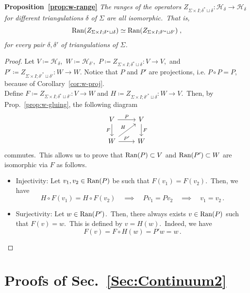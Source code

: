 \documentclass[11pt]{article}
\theoremstyle{definition}
\numberwithin{equation}{section}
\begin{document}
\noindent
\textbf{Proposition~\ref{prop:w-range}} \emph{The ranges of the operators $Z_{\Sigma\times I;\delta^* \sqcup \delta}:\mathcal{H}_{\delta}\to\mathcal{H}_{\delta}$ for different triangulations $\delta$ of $\Sigma$ are all isomorphic.~That is,  
   \begin{equation}
   {\rm Ran}(Z_{\Sigma\times I;\delta^* \sqcup \delta})\simeq {\rm Ran}(Z_{\Sigma\times I;\delta'^* \sqcup \delta'})\;,
   \end{equation}
   for every pair $\delta,\delta'$ of triangulations of $\Sigma$.}
\begin{proof}
    Let $V\coloneqq \mathcal{H}_{\delta}$,~$W\coloneqq \mathcal{H}_{\delta'}$,~$P\coloneqq Z_{\Sigma\times I;\delta^* \sqcup \delta}:V\to V$,~and $P'\coloneqq Z_{\Sigma\times I;\delta'^* \sqcup \delta'}:W\to W$. Notice that $P$ and $P'$ are projections, i.e. $P\circ P=P$, because of Corollary~\ref{cor:w-proj}. \\
    Define $F\coloneqq Z_{\Sigma\times I;\delta^* \sqcup \delta'}:V\to W$ and $H\coloneqq Z_{\Sigma\times I;\delta'^* \sqcup \delta}:W\to V$.~Then, by Prop.~\ref{prop:w-gluing}, the following diagram
    \begin{equation}
        \begin{tikzcd}
    V \arrow[r, "P"] \arrow[d, "F" left] & V \arrow[d, "F"]\\
    W \arrow[ur, "H"] \arrow[r,"P'"] & W
\end{tikzcd}
    \end{equation}
    commutes.~This allows us to prove that ${\rm Ran}(P)\subset V$ and ${\rm Ran}(P')\subset W$ are isomorphic via $F$ as follows.
    \begin{itemize}
        \item Injectivity: Let $v_1,v_2 \in {\rm Ran}(P)$ be such that $F(v_1)=F(v_2)$.~Then, we have
        \[H\circ F(v_1)=H\circ F(v_2)\quad\implies\quad Pv_1=Pv_2\quad\implies\quad v_1=v_2\,.\]
        \item Surjectivity: Let $w\in {\rm Ran}(P')$.~Then, there always exists $v\in {\rm Ran}(P)$ such that $F(v)=w$.~This is defined by $v=H(w)$.~Indeed, we have \[F(v)=F\circ H(w)=P'w=w\,.\]
    \end{itemize}
\end{proof}

\section{Proofs of Sec.~\ref{Sec:Continuum2}}\label{App:Proofs2}
\end{document}
